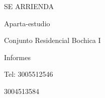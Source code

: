 \documentclass[final]{beamer}
\date{Jul. 31th, 2007}
\begin{document}
  \begin{frame}{}
\centering
  \begin{block}
  \centering
      {\VERYHuge \begin{center}
      SE ARRIENDA
      \end{center}}\par
      {\Large \begin{center}
      Aparta-estudio
      \end{center}}\par
      {\large \begin{center}
      Conjunto Residencial Bochica I
      \end{center}}\par
      {\large \begin{center}
      Informes
      \end{center}}\par
      {\Large \begin{center}
      Tel: 3005512546
      \end{center}}\par
      {\Large \begin{center}
      \hspace*{48pt} 3004513584
      \end{center}}\par  
  \end{block}
  \end{frame}
\end{document}
